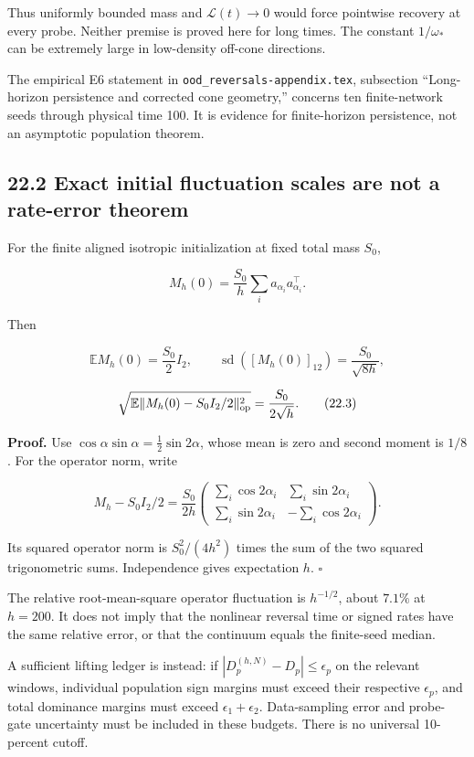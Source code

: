 \documentclass[
  10pt,
]{article}
\begin{document}
Thus uniformly bounded mass and \(\mathcal L(t)\to0\) would force
pointwise recovery at every probe. Neither premise is proved here for
long times. The constant \(1/\omega_*\) can be extremely large in
low-density off-cone directions.

The empirical E6 statement in \texttt{ood\_reversals-appendix.tex},
subsection ``Long-horizon persistence and corrected cone geometry,''
concerns ten finite-network seeds through physical time 100. It is
evidence for finite-horizon persistence, not an asymptotic population
theorem.

\subsection{22.2 Exact initial fluctuation scales are not a rate-error
theorem}\label{exact-initial-fluctuation-scales-are-not-a-rate-error-theorem}

For the finite aligned isotropic initialization at fixed total mass
\(S_0\),

\[
 M_h(0)=\frac{S_0}{h}\sum_i a_{\alpha_i}a_{\alpha_i}^\top.
\]

Then

\[
 \mathbb E M_h(0)=\frac{S_0}{2}I_2,\qquad
 \operatorname{sd}([M_h(0)]_{12})=\frac{S_0}{\sqrt{8h}},
\]

\[
 \sqrt{\mathbb E\|M_h(0)-S_0I_2/2\|_{\rm op}^2}
 =\frac{S_0}{2\sqrt h}.
 \tag{22.3}
\]

\textbf{Proof.} Use \(\cos\alpha\sin\alpha=\frac12\sin2\alpha\), whose
mean is zero and second moment is \(1/8\). For the operator norm, write

\[
 M_h-S_0I_2/2=\frac{S_0}{2h}
 \begin{pmatrix}\sum_i\cos2\alpha_i&\sum_i\sin2\alpha_i\\
                 \sum_i\sin2\alpha_i&-\sum_i\cos2\alpha_i\end{pmatrix}.
\]

Its squared operator norm is \(S_0^2/(4h^2)\) times the sum of the two
squared trigonometric sums. Independence gives expectation \(h\).
\(\square\)

The relative root-mean-square operator fluctuation is \(h^{-1/2}\),
about \(7.1\%\) at \(h=200\). It does not imply that the nonlinear
reversal time or signed rates have the same relative error, or that the
continuum equals the finite-seed median.

A sufficient lifting ledger is instead: if
\(|D_p^{(h,N)}-D_p|\le\epsilon_p\) on the relevant windows, individual
population sign margins must exceed their respective \(\epsilon_p\), and
total dominance margins must exceed \(\epsilon_1+\epsilon_2\).
Data-sampling error and probe-gate uncertainty must be included in these
budgets. There is no universal 10-percent cutoff.
\end{document}
